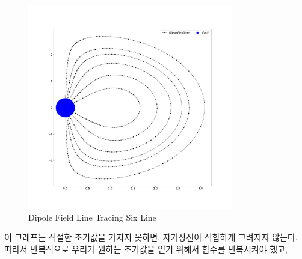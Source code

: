 \documentclass[11pt]{article}
\begin{document}
\begin{figure}[!ht]
  \centering
  \includegraphics[width=0.8\textwidth]{Electric2.pdf}
  \caption{Dipole Field Line Tracing Six Line}
\end{figure} 
이 그래프는 적절한 초기값을 가지지 못하면, 자기장선이 적합하게 그려지지 않는다. 따라서 반복적으로 우리가 원하는 초기값을 얻기 위해서 함수를 반복시켜야 했고, 
\end{document}
